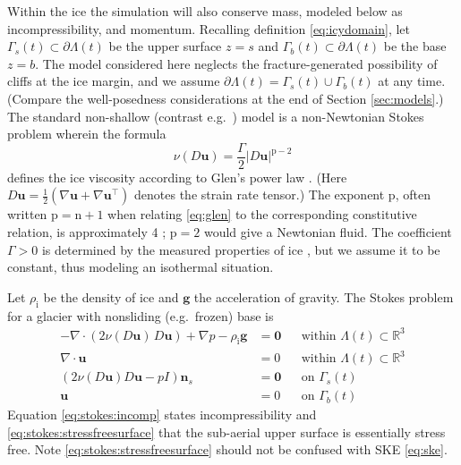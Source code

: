 \documentclass[hidelinks,onefignum,onetabnum,final]{siamart220329}  %
\newcommand{\RR}{\mathbb{R}}
\newcommand{\grad}{\nabla}
\newcommand{\bg}{\mathbf{g}}
\newcommand{\bn}{\mathbf{n}}
\newcommand{\bu}{\mathbf{u}}
\newcommand{\bzero}{\bm{0}}
\newcommand{\nn}{{\text{n}}}
\newcommand{\pp}{{\text{p}}}
\newcommand{\rhoi}{\rho_{\text{i}}}
\begin{document}
Within the ice the simulation will also conserve mass, modeled below as incompressibility, and momentum.  Recalling definition \eqref{eq:icydomain}, let $\Gamma_s(t) \subset \partial \Lambda(t)$ be the upper surface $z=s$ and
$\Gamma_b(t) \subset \partial \Lambda(t)$ be the base $z=b$.  The model considered here neglects the fracture-generated possibility of cliffs at the ice margin, and we assume $\partial \Lambda(t) = \Gamma_s(t) \cup \Gamma_b(t)$ at any time.  (Compare the well-posedness considerations at the end of Section \ref{sec:models}.)  The standard non-shallow (contrast e.g.~\cite{JouvetBueler2012}) model is a non-Newtonian Stokes problem \cite{GreveBlatter2009,JouvetRappaz2011,SchoofHewitt2013} wherein the formula
\begin{equation}
\nu(D\bu) = \frac{\Gamma}{2} |D\bu|^{\pp-2} \label{eq:glen}
\end{equation}
defines the ice viscosity according to Glen's power law \cite{GreveBlatter2009}.  (Here  $D\bu=\frac{1}{2}(\grad \bu + \grad \bu^{\top})$ denotes the strain rate tensor.)  The exponent $\pp$, often written $\pp=\nn+1$ when relating \eqref{eq:glen} to the corresponding constitutive relation, is approximately 4 \cite{GoldsbyKohlstedt2001}; $\pp=2$ would give a Newtonian fluid.  The coefficient $\Gamma>0$ is determined by the measured properties of ice \cite{GoldsbyKohlstedt2001,GreveBlatter2009}, but we assume it to be constant, thus modeling an isothermal situation.

Let $\rhoi$ be the density of ice and $\bg$ the acceleration of gravity.  The Stokes problem for a glacier with nonsliding (e.g.~frozen) base \cite{JouvetRappaz2011} is
\begin{subequations}
\label{eq:stokes}
\begin{align}
- \nabla \cdot \left(2 \nu(D\bu)\, D\bu\right) + \nabla p - \rhoi \bg &= \bzero && \text{within $\Lambda(t) \subset \RR^3$} \\
\nabla \cdot \bu &= 0 && \text{within $\Lambda(t) \subset \RR^3$} \label{eq:stokes:incomp} \\
\left(2 \nu(D\bu) D\bu - pI\right) \bn_s &= \bzero && \text{on $\Gamma_s(t)$}\label{eq:stokes:stressfreesurface} \\
\bu  &= 0 && \text{on $\Gamma_b(t)$}
\end{align}
\end{subequations}
Equation \eqref{eq:stokes:incomp} states incompressibility and \eqref{eq:stokes:stressfreesurface} that the sub-aerial upper surface is essentially stress free.  Note \eqref{eq:stokes:stressfreesurface} should not be confused with SKE \eqref{eq:ske}.
\end{document}
